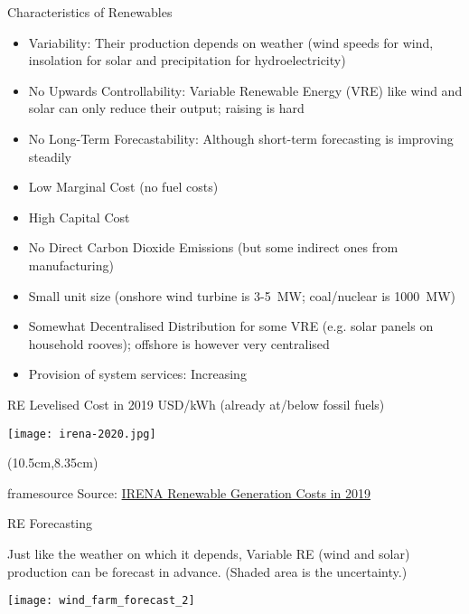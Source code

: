 \documentclass[10pt,aspectratio=169,dvipsnames]{beamer}
\newcommand{\source}[1]{\begin{textblock*}{5cm}(10.5cm,8.35cm)
    \begin{beamercolorbox}[ht=0.5cm,right]{framesource}
        \usebeamerfont{framesource}\usebeamercolor[fg]{framesource} Source: {#1}
    \end{beamercolorbox}
\end{textblock*}}
\let\olditem\item
\renewcommand{\item}{%
\olditem\vspace{5pt}}
\begin{document}
\begin{frame}{Characteristics of Renewables}

  \begin{itemize}
  \item \alert{Variability}: Their production depends on weather (wind speeds for wind, insolation for solar and precipitation for hydroelectricity)
  \item \alert{No Upwards Controllability}: Variable Renewable Energy (VRE) like wind and solar can only reduce their output; raising is hard
  \item \alert{No Long-Term Forecastability}: Although short-term forecasting is improving steadily
  \item \alert{Low Marginal Cost} (no fuel costs)
  \item \alert{High Capital Cost}
  \item \alert{No Direct Carbon Dioxide Emissions} (but some indirect ones from manufacturing)
  \item \alert{Small unit size} (onshore wind turbine is 3-5~MW; coal/nuclear is 1000~MW)
  \item \alert{Somewhat Decentralised Distribution} for some VRE (e.g. solar panels on household rooves); offshore is however very centralised
    \item \alert{Provision of system services}: Increasing
  \end{itemize}

\end{frame}

\begin{frame}{RE Levelised Cost in 2019 USD/kWh  (already at/below fossil fuels)}

  \centering
  \texttt{[image: irena-2020.jpg]}

  \source{\href{https://www.irena.org/publications/2020/Jun/Renewable-Power-Costs-in-2019}{IRENA Renewable Generation Costs in 2019}}
\end{frame}


\begin{frame}{RE Forecasting}

  Just like the weather on which it depends, Variable RE (wind and
  solar) production can be forecast in advance.   (Shaded area is the uncertainty.)

  \centering
  \texttt{[image: wind\_farm\_forecast\_2]}
\end{frame}
\end{document}
